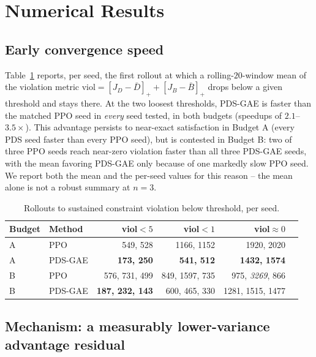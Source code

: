 \documentclass[conference]{IEEEtran}
\begin{document}
\section{Numerical Results}
\label{sec:results}

\subsection{Early convergence speed}

Table~\ref{tab:speed} reports, per seed, the first rollout at which a rolling-$20$-window
mean of the violation metric $\text{viol} = [J_D-\bar D]_+ + [J_B - \bar B]_+$ drops
below a given threshold and stays there. At the two loosest thresholds, PDS-GAE is
faster than the matched PPO seed in \emph{every} seed tested, in both budgets
(speedups of $2.1$--$3.5\times$). This advantage persists to near-exact satisfaction in
Budget A (every PDS seed faster than every PPO seed), but is contested in Budget B:
two of three PPO seeds reach near-zero violation faster than all three PDS-GAE seeds,
with the mean favoring PDS-GAE only because of one markedly slow PPO seed. We report
both the mean and the per-seed values for this reason -- the mean alone is not a
robust summary at $n{=}3$.

\begin{table}[t]
\centering
\caption{Rollouts to sustained constraint violation below threshold, per seed.}
\label{tab:speed}
\begin{tabular}{@{}llrrrr@{}}
\toprule
Budget & Method & viol$<5$ & viol$<1$ & viol$\approx 0$ \\
\midrule
A & PPO      & 549, 528           & 1166, 1152        & 1920, 2020 \\
A & PDS-GAE  & \textbf{173, 250}  & \textbf{541, 512}  & \textbf{1432, 1574} \\
B & PPO      & 576, 731, 499      & 849, 1597, 735     & 975, \emph{3269}, 866 \\
B & PDS-GAE  & \textbf{187, 232, 143} & 600, 465, 330  & 1281, 1515, 1477 \\
\bottomrule
\end{tabular}
\end{table}

\subsection{Mechanism: a measurably lower-variance advantage residual}
\end{document}
